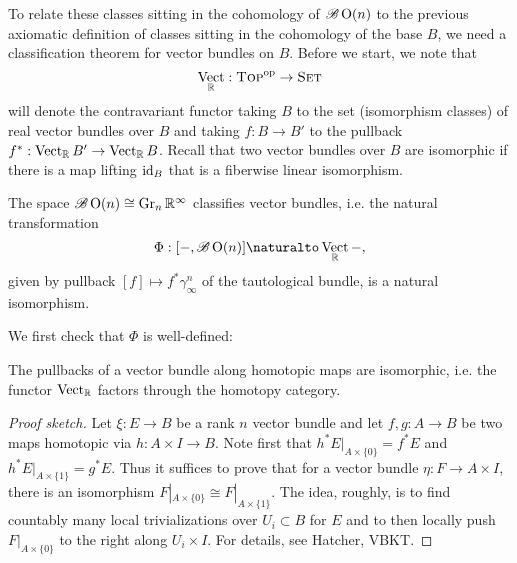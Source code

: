 \documentclass{amsart}
\DeclareMathOperator{\Vect}{Vect}
\begin{document}
To relate these classes sitting in the cohomology of $\mathscr{B}\operatorname{O}(n)$ to the previous
axiomatic definition of classes sitting in the cohomology of the base $B$, we need a classification
theorem for vector bundles on $B$.
Before we start, we note that
\begin{equation*}
    \Vect_\R:\textsc{Top}^\mathrm{op}\to\textsc{Set}
\end{equation*}
will denote the contravariant functor taking $B$ to the set (isomorphism classes) of real vector bundles
over $B$ and taking $f:B\to B'$ to the pullback $f^*:\Vect_\R B'\to \Vect_\R B$. Recall that two
vector bundles over $B$ are isomorphic if there is a map lifting $\operatorname{id}_B$ that is a fiberwise linear
isomorphism.

\begin{theorem}
    The space $\mathscr{B}\operatorname{O}(n)\cong\operatorname{Gr}_n\mathbb{R}^\infty$ classifies vector bundles, i.e. the natural
    transformation
    \begin{equation*}
        \Phi: [-,\mathscr{B}\OO(n)] \naturalto \Vect_\R-,
    \end{equation*}
    given by pullback $[f]\mapsto f^*\gamma^n_\infty$ of the tautological bundle, is a natural isomorphism.
    \label{class}
\end{theorem}

We first check that $\Phi$ is well-defined:
\begin{lemma}
    The pullbacks of a vector bundle along homotopic maps are isomorphic, i.e.  the functor $\Vect_\R$ factors
    through the homotopy category.
\end{lemma}
\begin{proof}[Proof sketch]
    Let $\xi:E\to B$ be a rank $n$ vector bundle and let $f,g:A\to B$ be two maps homotopic via
    $h:A\times I\to B$. Note first that $h^*E|_{A\times\{0\}}=f^*E$ and $h^*E|_{A\times\{1\}}=g^*E$.
    Thus it suffices to prove that for a vector bundle $\eta:F\to A\times I$, there is an isomorphism
    $F|_{A\times\{0\}}\cong F|_{A\times\{1\}}$. The idea, roughly, is to find countably many local
    trivializations over $U_i\subset B$ for $E$ and to then locally push
    $F|_{A\times\{0\}}$ to the right along $U_i\times I$. For details, see {\color{magenta}Hatcher, VBKT}.
\end{proof}
\end{document}
